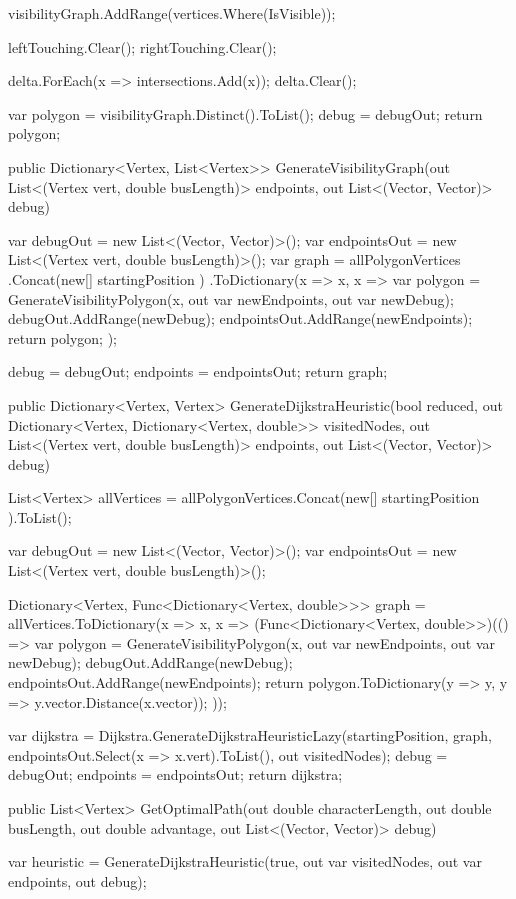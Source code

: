 \documentclass[12pt]{article}
\begin{document}
\begin{Csharp}[caption=class Map]
{{        visibilityGraph.AddRange(vertices.Where(IsVisible));

        leftTouching.Clear();
        rightTouching.Clear();

        delta.ForEach(x => intersections.Add(x));
        delta.Clear();
    }

    var polygon = visibilityGraph.Distinct().ToList();
    debug = debugOut;
    return polygon;
}

public Dictionary<Vertex, List<Vertex>> GenerateVisibilityGraph(out List<(Vertex vert, double busLength)> endpoints, out List<(Vector, Vector)> debug)
{
    var debugOut = new List<(Vector, Vector)>();
    var endpointsOut = new List<(Vertex vert, double busLength)>();
    var graph =
        allPolygonVertices
        .Concat(new[] { startingPosition })
        .ToDictionary(x => x, x =>
        {
            var polygon = GenerateVisibilityPolygon(x, out var newEndpoints, out var newDebug);
            debugOut.AddRange(newDebug);
            endpointsOut.AddRange(newEndpoints);
            return polygon;
        });

    debug = debugOut;
    endpoints = endpointsOut;
    return graph;
}

public Dictionary<Vertex, Vertex> GenerateDijkstraHeuristic(bool reduced, out Dictionary<Vertex, Dictionary<Vertex, double>> visitedNodes, out List<(Vertex vert, double busLength)> endpoints, out List<(Vector, Vector)> debug)
{
    List<Vertex> allVertices = allPolygonVertices.Concat(new[] { startingPosition }).ToList();

    var debugOut = new List<(Vector, Vector)>();
    var endpointsOut = new List<(Vertex vert, double busLength)>();

    Dictionary<Vertex, Func<Dictionary<Vertex, double>>> graph =
        allVertices.ToDictionary(x => x, x =>
        (Func<Dictionary<Vertex, double>>)(() =>
            {
                var polygon = GenerateVisibilityPolygon(x, out var newEndpoints, out var newDebug);
                debugOut.AddRange(newDebug);
                endpointsOut.AddRange(newEndpoints);
                return polygon.ToDictionary(y => y, y => y.vector.Distance(x.vector));
            }
        ));

    var dijkstra = Dijkstra.GenerateDijkstraHeuristicLazy(startingPosition, graph, endpointsOut.Select(x => x.vert).ToList(), out visitedNodes);
    debug = debugOut;
    endpoints = endpointsOut;
    return dijkstra;
}

public List<Vertex> GetOptimalPath(out double characterLength, out double busLength, out double advantage, out List<(Vector, Vector)> debug)
{
    var heuristic = GenerateDijkstraHeuristic(true, out var visitedNodes, out var endpoints, out debug);

}
\end{Csharp}
\end{document}
